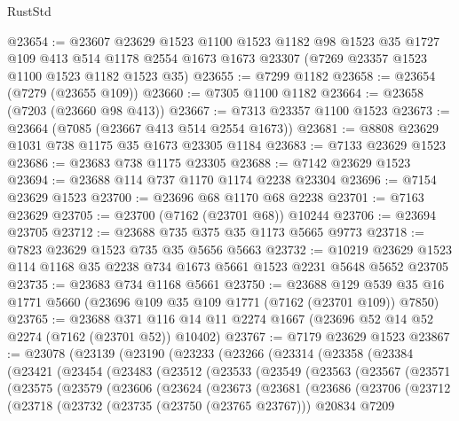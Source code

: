 \begin{lexlean}{RustStd}
\begin{coremodule}
@23654 := @23607
    @23629
    @1523
    @1100
    @1523
    @1182
    @98
    @1523
    @35
    @1727
    @109
    @413
    @514
    @1178
    @2554
    @1673
    @1673
    @23307
    (@7269 @23357 @1523 @1100 @1523 @1182 @1523 @35)
@23655 := @7299 @1182
@23658 := @23654 (@7279 (@23655 @109))
@23660 := @7305 @1100 @1182
@23664 := @23658 (@7203 (@23660 @98 @413))
@23667 := @7313 @23357 @1100 @1523
@23673 := @23664 (@7085 (@23667 @413 @514 @2554 @1673))
@23681 := @8808 @23629 @1031 @738 @1175 @35 @1673 @23305 @1184
@23683 := @7133 @23629 @1523
@23686 := @23683 @738 @1175 @23305
@23688 := @7142 @23629 @1523
@23694 := @23688 @114 @737 @1170 @1174 @2238 @23304
@23696 := @7154 @23629 @1523
@23700 := @23696 @68 @1170 @68 @2238
@23701 := @7163 @23629
@23705 := @23700 (@7162 (@23701 @68)) @10244
@23706 := @23694 @23705
@23712 := @23688 @735 @375 @35 @1173 @5665 @9773
@23718 := @7823 @23629 @1523 @735 @35 @5656 @5663
@23732 := @10219 @23629 @1523 @114 @1168 @35 @2238 @734 @1673 @5661 @1523 @2231 @5648 @5652 @23705
@23735 := @23683 @734 @1168 @5661
@23750 := @23688
    @129
    @539
    @35
    @16
    @1771
    @5660
    (@23696 @109 @35 @109 @1771 (@7162 (@23701 @109)) @7850)
@23765 := @23688
    @371
    @116
    @14
    @11
    @2274
    @1667
    (@23696 @52 @14 @52 @2274 (@7162 (@23701 @52)) @10402)
@23767 := @7179 @23629 @1523
@23867 := @23078
    (@23139
      (@23190
        (@23233
          (@23266
            (@23314
              (@23358
                (@23384
                  (@23421
                    (@23454
                      (@23483
                        (@23512
                          (@23533
                            (@23549
                              (@23563
                                (@23567
                                  (@23571
                                    (@23575
                                      (@23579
                                        (@23606
                                          (@23624
                                            (@23673
                                              (@23681
                                                (@23686
                                                  (@23706
                                                    (@23712
                                                      (@23718
                                                        (@23732
                                                          (@23735 (@23750 (@23765 @23767)))
                                                          @20834
                                                          @7209

\end{coremodule}
\end{lexlean}
